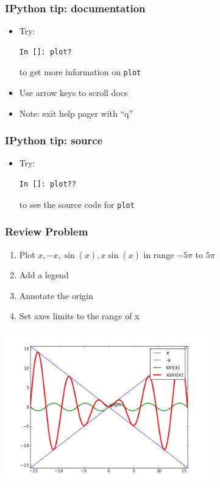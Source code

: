 \documentclass[14pt,compress]{beamer}
\newcommand{\typ}[1]{\lstinline{#1}}
\begin{document}
\begin{frame}[fragile]
\frametitle{IPython tip: documentation}

\begin{itemize}

    \item Try:
\begin{lstlisting}
In []: plot?
\end{lstlisting}
      \vspace*{0.2in}
        to get more information on \typ{plot}

      \item Use arrow keys to scroll docs
      \item Note: exit help pager with ``q''
\end{itemize}
\end{frame}

\begin{frame}[fragile]
\frametitle{IPython tip: source}
\begin{itemize}
    \item Try:
\begin{lstlisting}
In []: plot??
\end{lstlisting}
    to see the source code for \typ{plot}

\end{itemize}
\end{frame}


\begin{frame}
\frametitle{Review Problem}
\begin{enumerate}
\item Plot $x, -x, \sin(x), x \sin(x)$ in range $-5\pi$ to $5\pi$
\item Add a legend
\item Annotate the origin
\item Set axes limits to the range of x
\end{enumerate}
\vspace*{-0.15in}
\begin{center}
  \includegraphics[height=2.6in, interpolate=true]{data/four_plot}
\end{center}
\end{frame}
\end{document}
